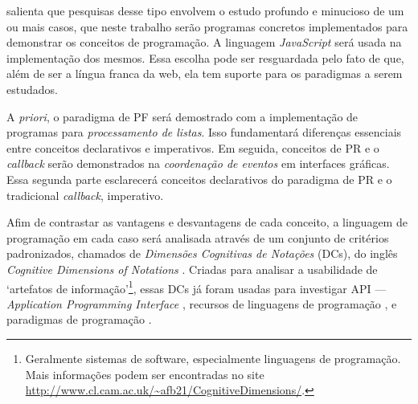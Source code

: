 \textcite{yin2001} salienta que pesquisas desse tipo envolvem o estudo profundo
e minucioso de um ou mais casos, que neste trabalho serão programas concretos
implementados para demonstrar os conceitos de programação.
A linguagem \emph{JavaScript} será usada na implementação dos mesmos.
Essa escolha pode ser resguardada pelo fato de que, além de ser a língua
franca da web, ela tem suporte para os paradigmas a serem estudados.

A \emph{priori}, o paradigma de PF será demostrado com a implementação de programas
para \emph{processamento de listas}.
Isso fundamentará diferenças essenciais entre conceitos declarativos e
imperativos.
Em seguida, conceitos de PR e o \emph{callback} serão demonstrados na \emph{coordenação
de eventos} em interfaces gráficas.
Essa segunda parte esclarecerá conceitos declarativos do paradigma de PR e o
tradicional \emph{callback}, imperativo.

Afim de contrastar as vantagens e desvantagens de cada conceito, a linguagem de
programação em cada caso será analisada através de um conjunto de critérios
padronizados, chamados de \emph{Dimensões Cognitivas de Notações} (DCs), do inglês
\emph{Cognitive Dimensions of Notations} \cite{green1989}.
Criadas para analisar a usabilidade de ‘artefatos de
informação’\footnote{Geralmente sistemas de software, especialmente linguagens de
programação. Mais informações podem ser encontradas no site
\url{http://www.cl.cam.ac.uk/\~afb21/CognitiveDimensions/}.}, essas DCs já foram usadas para investigar API
— \emph{Application Programming Interface} \cite{clarke2003}, recursos de linguagens
de programação \cite{sadowski2011}, e paradigmas de programação \cite{kiss2014}.

